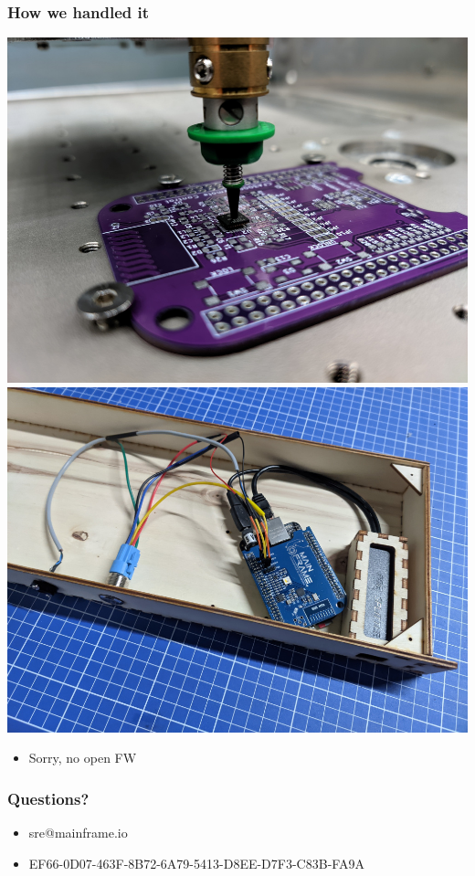 \documentclass[aspectratio=169]{beamer}
\begin{document}
\begin{frame}
	\frametitle{How we handled it}

	\includegraphics[height=0.55\textheight]{MRF89XA-BBB-Cape-1.jpg}
	\includegraphics[height=0.55\textheight]{MRF89XA-BBB-Cape-3.jpg}

	\begin{itemize}
		\item Sorry, no open FW
	\end{itemize}
\end{frame}

\begin{frame}
	\frametitle{Questions?}

	\large

	\begin{itemize}
		\item sre@mainframe.io
		\item EF66-0D07-463F-8B72-6A79-5413-D8EE-D7F3-C83B-FA9A
	\end{itemize}
\end{frame}
\end{document}
